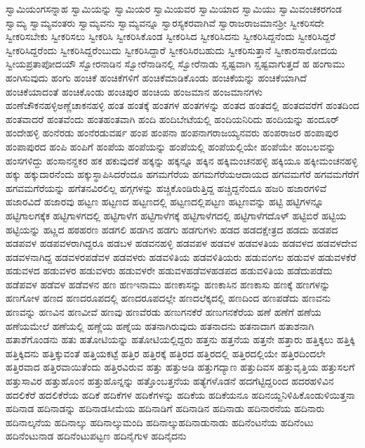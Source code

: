 {ಸ್ವಾಮಿಯಂಗಸನ್ನಾಹ
ಸ್ವಾಮಿಯನ್ನು
ಸ್ವಾಮಿಯರ
ಸ್ವಾಮಿಯವರ
ಸ್ವಾಮಿಯಾದ
ಸ್ವಾಮಿಯು
ಸ್ವಾಮಿವಂಚಕರಗಂಡ
ಸ್ವಾಮ್ಯ
ಸ್ವಾಮ್ಯವಂತರು
ಸ್ವಾಮ್ಯವನು
ಸ್ವಾಮ್ಯವನ್ನೂ
ಸ್ವಾರಸ್ಯಕರವಾಗಿವೆ
ಸ್ವಾರಾಜರಾಜಮಾನಶ್ರೀ
ಸ್ವೀಕರಿಸದೇ
ಸ್ವೀಕರಿಸಬೇಕು
ಸ್ವೀಕರಿಸಲು
ಸ್ವೀಕರಿಸಿ
ಸ್ವೀಕರಿಸಿಕೊಂಡ
ಸ್ವೀಕರಿಸಿದ
ಸ್ವೀಕರಿಸಿದನು
ಸ್ವೀಕರಿಸಿದ್ದನೆಂದು
ಸ್ವೀಕರಿಸಿದ್ದರೆ
ಸ್ವೀಕರಿಸಿದ್ದರೆಂದು
ಸ್ವೀಕರಿಸಿದ್ದರೆಂಬುದು
ಸ್ವೀಕರಿಸಿದ್ದಾರೆ
ಸ್ವೀಕರಿಸಿರಬಹುದು
ಸ್ವೀಕರಿಸುತ್ತಾನೆ
ಸ್ವೀಕಾರಸಾರೋದಯ
ಸ್ವೀಯಪ್ರತಾಪೋದಯೌ
ಸ್ವೋರನಾಡಿನ
ಸ್ವೋರೆನಾಡಿನಲ್ಲಿ
ಸ್ವೋರೆನಾಡು
ಸ್ಷಷ್ಟವಾಗಿ
ಸ್ಷಷ್ಟವಾಗುತ್ತದೆ
ಹ
ಹಂಗಾಮು
ಹಂಗಿಸುವುದು
ಹಂಗು
ಹಂಚಿಕೆ
ಹಂಚಿಕೆಗಳಿಗೆ
ಹಂಚಿಕೆಮಾಡಿಕೊಂಡು
ಹಂಚಿಕೆಯನ್ನು
ಹಂಚಿಕೆಯಾಗಿದೆ
ಹಂಚಿಕೆಯಾದಂತೆ
ಹಂಚಿಕೊಂಡು
ಹಂಚಿಪುರ
ಹಂಚಿಯ
ಹಂಜಮಾನ
ಹಂಜಮಾನಗಳು
ಹಂಣೆಚೌಕನಹಳ್ಳಿಅಣ್ಣೆಚಾಕನಹಳ್ಳಿ
ಹಂತ
ಹಂತಕ್ಕೆ
ಹಂತಗಳ
ಹಂತಗಳನ್ನು
ಹಂತದ
ಹಂತದಲ್ಲಿ
ಹಂತದವರೆಗೆ
ಹಂತದಿಂದ
ಹಂತವಾದರೆ
ಹಂತವೆಂದು
ಹಂತಹಂತವಾಗಿ
ಹಂದಿ
ಹಂದಿಬೇಟೆಯಲ್ಲಿ
ಹಂದಿಯನಿರಿದು
ಹಂದಿಯನ್ನು
ಹಂದೂರ್
ಹಂದೇಹಳ್ಳಿ
ಹಂನೆರಡು
ಹಂನೆರಡುವರ್ಷ
ಹಂಪ
ಹಂಪನಾ
ಹಂಪನಾಗರಾಜಯ್ಯನವರು
ಹಂಪರಾಜರ
ಹಂಪಾಪುರ
ಹಂಪಾಪುರದ
ಹಂಪಿ
ಹಂಪಿಗೆ
ಹಂಪೆಯ
ಹಂಪೆಯನ್ನು
ಹಂಪೆಯಲ್ಲಿ
ಹಂಪೆಯಲ್ಲಿಯೇ
ಹಂಪೆಯೇ
ಹಂಬಲವನ್ನು
ಹಂಸಗಳಿದ್ದು
ಹಂಸಾನನ್ದಕರ
ಹಕ
ಹಕುವುದಕೆ
ಹಕ್ಕನ್ನು
ಹಕ್ಕನ್ನೂ
ಹಕ್ಕಿನ
ಹಕ್ಕಿಮಂಚನಹಳ್ಳಿ
ಹಕ್ಕಿಯೂ
ಹಕ್ಕೀಮಂಚನಹಳ್ಳಿ
ಹಕ್ಕು
ಹಕ್ಕುದಾರನೆಂದು
ಹಕ್ಕುಸ್ಥಾಪಿಸಿದರೆಂದೂ
ಹಗಮಗೆರೆಯ
ಹಗಮಗೆರೆಯಆದಾಯದ
ಹಗವಮಗೆರೆ
ಹಗವಮಗೆರೆಗೆ
ಹಗವಮಗೆರೆಯನ್ನು
ಹಗೆತನವಿರಲಿಲ್ಲ
ಹಗ್ಗಗಳನ್ನು
ಹಚ್ಚಿಕೊಂಡಿರುತ್ತಿದ್ದ
ಹಚ್ಚಿದ್ದನೆಂದೂ
ಹಜರಿ
ಹಜಾರಗಳಿವೆ
ಹಜಾರವಿದೆ
ಹಜಾರವು
ಹಟ್ಟಣ
ಹಟ್ಟಣದ
ಹಟ್ಟಣದಲ್ಲಿ
ಹಟ್ಟಣದಲ್ಲಿಪಟ್ಟಣ
ಹಟ್ಟಣವನ್ನು
ಹಟ್ಟಿ
ಹಟ್ಟಿಗಳನ್ನೂ
ಹಟ್ಟಿಗಾಲಗಕ್ಕೆಕ
ಹಟ್ಟಿಗಾಳಗದಲ್ಲಿ
ಹಟ್ಟಿಗಾಳೆಗ
ಹಟ್ಟಿಗಾಳೆಗಕ್ಕೆ
ಹಟ್ಟಿಗಾಳೆಗದಲ್ಲಿ
ಹಟ್ಟಿಗಾಳೆಗದೊಳ್
ಹಟ್ಟಿಬಿರೆ
ಹಟ್ಟಿಯ
ಹಟ್ಟಿಯನ್ನು
ಹಟ್ಣದ
ಹಠಹರಣ
ಹಡಗಲಿ
ಹಡಗಿನ
ಹಡಗು
ಹಡಗುಗಳು
ಹಡದ
ಹಡದಕ್ಷೇತ್ರದ
ಹಡದು
ಹಡಪದ
ಹಡಪವಳ
ಹಡಪವಳರಾಗಿದ್ದರೂ
ಹಡಬಳ
ಹಡವನಹಳ್ಳಿ
ಹಡವಪಳ
ಹಡವಳ
ಹಡವಳತಿಯ
ಹಡವಳದ
ಹಡವಳದೇವ
ಹಡವಳನಾಗಿದ್ದ
ಹಡವಳರಪಡೆವಳ
ಹಡವಳರು
ಹಡವಳಿತಿಯ
ಹಡವಳಿತಿಯರು
ಹಡುವಂಗಲ
ಹಡುವಳ
ಹಡುವಳಕೆರೆ
ಹಡುವಳದ
ಹಡುವಳರ
ಹಡುವಳರು
ಹಡುವಳರೇ
ಹಡುವಳಹಡೆವಳಹಡಪದ
ಹಡುವಳಿತಿಯ
ಹಡೆದುಪಡೆದು
ಹಡೆಪವಳ
ಹಡೆವಳ
ಹಡೆವಳನ
ಹಣ
ಹಣಇನಾಮು
ಹಣಕಾಸನ್ನು
ಹಣಕಾಸಿನ
ಹಣಕಾಸು
ಹಣಕ್ಕೆ
ಹಣಗಳನ್ನು
ಹಣಗೋಳ
ಹಣದ
ಹಣದರೂಪದಲ್ಲಿ
ಹಣದರೂಪದಲ್ಲೇ
ಹಣದಲೆಕ್ಕದಲ್ಲಿ
ಹಣದಿಂದ
ಹಣಪಡೆದು
ಹಣವನು
ಹಣವನ್ನು
ಹಣವಿನ
ಹಣವೀವೆ
ಹಣವು
ಹಣವೆರಡು
ಹಣುಗನಕೆರೆ
ಹಣುಗನಕೆರೆಯ
ಹಣೆ
ಹಣೆಗೆ
ಹಣೆಯ
ಹಣೆಯಮೇಲೆ
ಹಣೆಯಲ್ಲಿ
ಹಣ್ಣೆಯ
ಹಣ್ನೆಯ
ಹತನಾಗಿರುವುದು
ಹತನಾದನು
ಹತನಾದಾಗ
ಹತಾಶನಾಗಿ
ಹತಾಶೆಗೊಂಡನು
ಹತು
ಹತೋಟಿಯನ್ನು
ಹತೋಟಿಯಲ್ಲಿದ್ದರು
ಹತ್ತನು
ಹತ್ತನೆಯ
ಹತ್ತನೇ
ಹತ್ತಾರು
ಹತ್ತಿಕ್ಕಲು
ಹತ್ತಿಕ್ಕಿ
ಹತ್ತಿಕ್ಕಿದನು
ಹತ್ತಿಕ್ಕುವಂತೆ
ಹತ್ತಿಯಕಟ್ಟೆ
ಹತ್ತಿರ
ಹತ್ತಿರಕ್ಕೆ
ಹತ್ತಿರದ
ಹತ್ತಿರದಲ್ಲಿ
ಹತ್ತಿರದಲ್ಲಿಯೇ
ಹತ್ತಿರದಿಂದಲೇ
ಹತ್ತಿರವಾದ
ಹತ್ತಿರವಾಯಿತೆಂದು
ಹತ್ತಿರವಿರುವ
ಹತ್ತು
ಹತ್ತುಅಡಿ
ಹತ್ತುಗದ್ಯಾಣ
ಹತ್ತುದಿವಸ
ಹತ್ತುವೃತ್ತಿಯ
ಹತ್ತುಸಲಗೆ
ಹತ್ತುಸಾವಿರ
ಹತ್ತುಹೊಂನ
ಹತ್ತುಹೊನ್ನನ್ನು
ಹತ್ತೊಂಬತ್ತನೆಯ
ಹತ್ಯೆಗಳೊಡನೆ
ಹದಗೆಟ್ಟಿದ್ದರಿಂದ
ಹದರಹಳಿವಿನ
ಹದಲಿಕೆರೆ
ಹದಲಿಕೆರೆಯ
ಹದಿಕೆ
ಹದಿಕೆಗಳ
ಹದಿಕೆಗಳನ್ನು
ಹದಿಕೆಯ
ಹದಿಕೆಯನೂ
ಹದಿನಯ್ದನಿಳಿಹಿಕೊಂಡುಳಿಯಿತ್ತನಾ
ಹದಿನಾಡ
ಹದಿನಾಡನ್ನು
ಹದಿನಾಡಸೀಮೆಯ
ಹದಿನಾಡಿಗೆ
ಹದಿನಾಡಿನ
ಹದಿನಾಡು
ಹದಿನಾರನೆಯ
ಹದಿನಾರು
ಹದಿನಾಲ್ಕನೆಯ
ಹದಿನಾಲ್ಕು
ಹದಿನಾಲ್ಕುಮಂದಿ
ಹದಿನಾಲ್ಕುಹದಿನಾಡುನಾಡು
ಹದಿನೆಂಟನೆಯ
ಹದಿನೆಂಟು
ಹದಿನೆಂಟುನಾಡ
ಹದಿನೆಂಟುಪಟ್ಟಣ
ಹದಿನೈಗುಳ
ಹದಿನೈದನು
}
